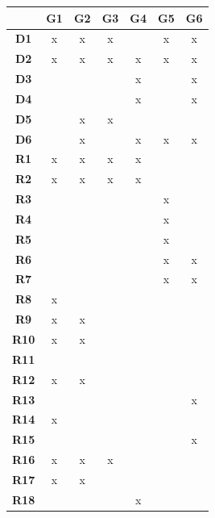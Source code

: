 \newpage
\begin{table}[H]
    \centering
    \begin{tabular}{|c|c|c|c|c|c|c|}
        \hline 
         & \textbf{G1} & \textbf{G2} & \textbf{G3} & \textbf{G4} & \textbf{G5} & \textbf{G6} \\ \hline
        \textbf{D1}  & x & x & x &   & x & x \\ \hline
        \textbf{D2}  & x & x & x & x & x & x \\ \hline
        \textbf{D3}  &   &   &   & x &   & x \\ \hline
        \textbf{D4}  &   &   &   & x &   & x \\ \hline
        \textbf{D5}  &   & x & x &   &   &   \\ \hline
        \textbf{D6}  &   & x &   & x & x & x \\ \hline
        \hline
        \textbf{R1}  & x & x & x & x &   &   \\ \hline
        \textbf{R2}  & x & x & x & x &   &   \\ \hline
        \textbf{R3}  &   &   &   &   & x &   \\ \hline
        \textbf{R4}  &   &   &   &   & x &   \\ \hline
        \textbf{R5}  &   &   &   &   & x &   \\ \hline
        \textbf{R6}  &   &   &   &   & x & x \\ \hline
        \textbf{R7}  &   &   &   &   & x & x \\ \hline
        \textbf{R8}  & x &   &   &   &   &   \\ \hline
        \textbf{R9}  & x & x &   &   &   &   \\ \hline
        \textbf{R10} & x & x &   &   &   &   \\ \hline
        \textbf{R11} &   &   &   &   &   &   \\ \hline
        \textbf{R12} & x & x &   &   &   &   \\ \hline
        \textbf{R13} &   &   &   &   &   & x \\ \hline
        \textbf{R14} & x &   &   &   &   &   \\ \hline
        \textbf{R15} &   &   &   &   &   & x \\ \hline
        \textbf{R16} & x & x & x &   &   &   \\ \hline
        \textbf{R17} & x & x &   &   &   &   \\ \hline
        \textbf{R18} &   &   &   & x &   &   \\ \hline

\end{tabular}
\end{table}
